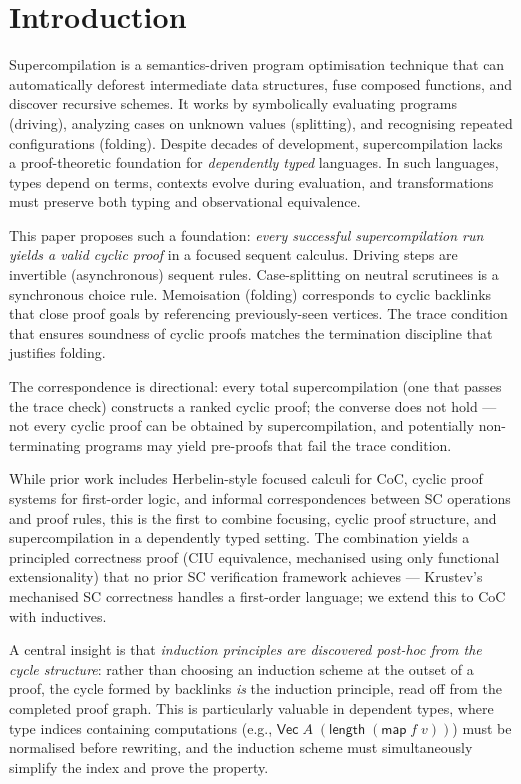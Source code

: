 \section{Introduction}
\label{sec:intro}

Supercompilation is a semantics-driven program optimisation technique that can automatically deforest intermediate data structures, fuse composed functions, and discover recursive schemes. It works by symbolically evaluating programs (driving), analyzing cases on unknown values (splitting), and recognising repeated configurations (folding). Despite decades of development, supercompilation lacks a proof-theoretic foundation for \emph{dependently typed} languages. In such languages, types depend on terms, contexts evolve during evaluation, and transformations must preserve both typing and observational equivalence.

This paper proposes such a foundation: \emph{every successful supercompilation run yields a valid cyclic proof} in a focused sequent calculus. Driving steps are invertible (asynchronous) sequent rules. Case-splitting on neutral scrutinees is a synchronous choice rule. Memoisation (folding) corresponds to cyclic backlinks that close proof goals by referencing previously-seen vertices. The trace condition that ensures soundness of cyclic proofs matches the termination discipline that justifies folding.

The correspondence is directional: every total supercompilation (one that passes the trace check) constructs a ranked cyclic proof; the converse does not hold — not every cyclic proof can be obtained by supercompilation, and potentially non-terminating programs may yield pre-proofs that fail the trace condition.

While prior work includes Herbelin-style focused calculi for CoC, cyclic proof systems for first-order logic, and informal correspondences between SC operations and proof rules, this is the first to combine focusing, cyclic proof structure, and supercompilation in a dependently typed setting. The combination yields a principled correctness proof (CIU equivalence, mechanised using only functional extensionality) that no prior SC verification framework achieves — Krustev's mechanised SC correctness handles a first-order language; we extend this to CoC with inductives.

A central insight is that \emph{induction principles are discovered post-hoc from the cycle structure}: rather than choosing an induction scheme at the outset of a proof, the cycle formed by backlinks \emph{is} the induction principle, read off from the completed proof graph. This is particularly valuable in dependent types, where type indices containing computations (e.g., $\mathsf{Vec}\;A\;(\mathsf{length}\;(\mathsf{map}\;f\;v))$) must be normalised before rewriting, and the induction scheme must simultaneously simplify the index and prove the property.

